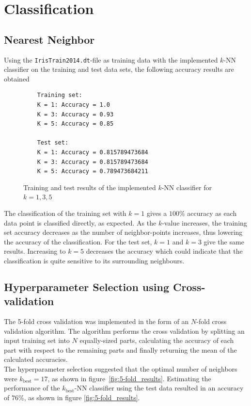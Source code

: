 \documentclass[a4paper]{article}
\begin{document}
\section{Classification}

\subsection{Nearest Neighbor}
Using the \texttt{IrisTrain2014.dt}-file as training data with the implemented $k$-NN classifier on the training and test data sets, the following accuracy results are obtained
\begin{figure}[H]
	\begin{lstlisting}
	Training set:
	K = 1: Accuracy = 1.0
	K = 3: Accuracy = 0.93
	K = 5: Accuracy = 0.85

	Test set:
	K = 1: Accuracy = 0.815789473684
	K = 3: Accuracy = 0.815789473684
	K = 5: Accuracy = 0.789473684211
	\end{lstlisting}
	\caption{Training and test results of the implemented $k$-NN classifier for $k=1,3,5$}
	\label{fig:k-nn_results}
\end{figure}

The classification of the training set with $k=1$ gives a $100\%$ accuracy as each data point is classified directly, as expected. As the $k$-value increases, the training set accuracy decreases as the number of neighbor-points increases, thus lowering the accuracy of the classification. For the test set, $k=1$ and $k=3$ give the same results. Increasing to $k=5$ decreases the accuracy which could indicate that the classification is quite sensitive to its surrounding neighbours.


\subsection{Hyperparameter Selection using Cross-validation}
The 5-fold cross validation was implemented in the form of an $N$-fold cross validation algorithm. The algorithm performs the cross validation by splitting an input training set into $N$ equally-sized parts, calculating the accuracy of each part with respect to the remaining parts and finally returning the mean of the calculated accuracies.\\

The hyperparameter selection suggested that the optimal number of neighbors were $k_{\text{best}} = 17$, as shown in figure~\ref{fig:5-fold_results}. Estimating the performance of the $k_{\text{best}}$-NN classifier using the test data resulted in an accuracy of $76\%$, as shown in figure \ref{fig:5-fold_results}. 
\end{document}
